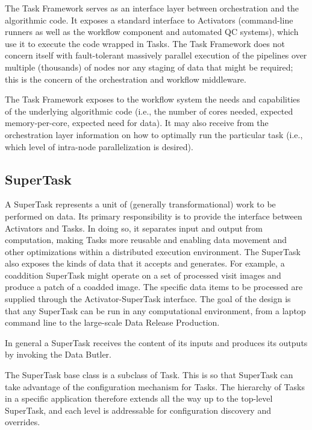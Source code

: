 \documentclass[DM,toc]{lsstdoc}
\begin{document}
The Task Framework serves as an interface layer between orchestration
and the algorithmic code. It exposes a standard interface to Activators
(command-line runners as well as the workflow component and automated QC
systems), which use it to execute the code wrapped in Tasks. The Task Framework
does not concern itself with fault-tolerant massively parallel execution of the
pipelines over multiple (thousands) of nodes nor any staging of data that might
be required; this is the concern of the orchestration and workflow middleware.

The Task Framework exposes to the workflow system the needs and capabilities
of the underlying algorithmic code (i.e., the number of cores needed, expected
memory-per-core, expected need for data). It may also receive from the
orchestration layer information on how to optimally run the particular task
(i.e., which level of intra-node parallelization is desired).


\subsection{SuperTask}\label{supertask}

A SuperTask represents a unit of (generally transformational) work to be
performed on data.  Its primary responsibility is to provide the interface
between Activators and Tasks.  In doing so, it separates input and output from
computation, making Tasks more reusable and enabling data movement and other
optimizations within a distributed execution environment.  The SuperTask also
exposes the kinds of data that it accepts and generates.  For example, a
coaddition SuperTask might operate on a set of processed visit images and
produce a patch of a coadded image.  The specific data items to be processed
are supplied through the Activator-SuperTask interface.  The goal of the
design is that any SuperTask can be run in any computational environment,
from a laptop command line to the large-scale Data Release Production.

In general a SuperTask receives the content of its inputs and produces its
outputs by invoking the Data Butler.

The SuperTask base class is a subclass of Task. This is so that SuperTask can
take advantage of the configuration mechanism for Tasks. The hierarchy of Tasks
in a specific application therefore extends all the way up to the top-level
SuperTask, and each level is addressable for configuration discovery and
overrides.
\end{document}
